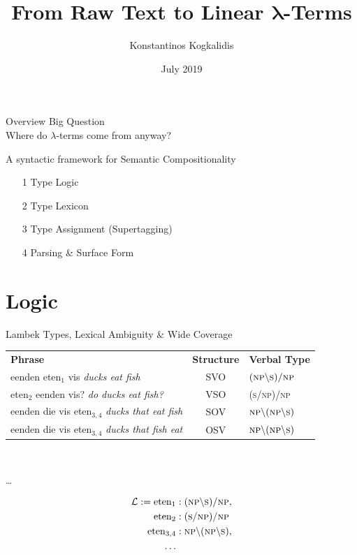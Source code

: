 \documentclass{beamer}
\title{From Raw Text to Linear $\mathbf{\lambda}$-Terms}
\author{Konstantinos Kogkalidis}
\institute{Compositionality in formal and distributional models of natural language}
\date{July 2019}
\begin{document}
\maketitle

\begin{frame}{Overview}
    \alert{Big Question}\\
    Where do $\lambda$-terms come from anyway?

    \pause
    \alert{A syntactic framework for Semantic Compositionality}\\
    \begin{itemize}
        \item[1] Type Logic
        \item[2] Type Lexicon
        \item[3] Type Assignment (Supertagging)
        \item[4] Parsing \& Surface Form
    \end{itemize}
\end{frame}

\section{Logic}
\begin{frame}{Lambek Types, Lexical Ambiguity \& Wide Coverage}
\begin{tabularx}{1\textwidth}{@{}lcX@{}}
    \textbf{Phrase} & \textbf{Structure} & \textbf{Verbal Type} \\
    eenden eten$_1$ vis {\footnotesize\textit{ducks eat fish}} & SVO & $(\textsc{np}\backslash\textsc{s})/\textsc{np}$ \\
    eten$_2$ eenden vis? {\footnotesize\textit{do ducks eat fish?}} & VSO & (\textsc{s}/\textsc{np})/\textsc{np} \\
    eenden die vis eten$_{3,4}$ {\footnotesize\textit{ducks that eat fish}} & SOV & $\textsc{np}\backslash(\textsc{np}\backslash\textsc{s})$ \\
    eenden die vis eten$_{3,4}$ {\footnotesize\textit{ducks that fish eat}} & OSV & $\textsc{np}\backslash(\textsc{np}\backslash\textsc{s})$ \\
\end{tabularx}\\
\begin{center}
    \dots
\end{center}

\pause
\begin{align*}
\mathcal{L} := \text{eten}_1 &: (\textsc{np}\backslash\textsc{s})/\textsc{np}, \\
			\text{eten}_2 &: (\textsc{s}/\textsc{np})/\textsc{np} \\
			\text{eten}_{3,4} &: \textsc{np}\backslash (\textsc{np}\backslash \textsc{s}), \\
			\dots 
\end{align*}

\centering 
\frownie 
\end{frame}
\end{document}
